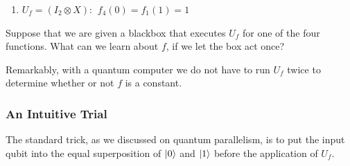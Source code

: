 \begin{enumerate}
\begin{figure}[H]
    \end{figure}
    \item $U_f =(I_2 \otimes X) $:
    \subitem $\ f_4(0)=f_1(1)=1$
    \begin{figure}[H]
        \centering
    \end{figure}
\end{enumerate}

Suppose that we are given a blackbox that executes $U_f$ for one of the four functions. What can we learn about $f$, if we let the box act once?

Remarkably, with a quantum computer we do not have to run $U_f$ twice to determine whether or not $f$ is a constant.

\subsubsection{An Intuitive Trial}
The standard trick, as we discussed on quantum parallelism, is to put the input qubit into the equal superposition of $\ket{0}$ and $\ket{1}$ before the application of $U_f$.


